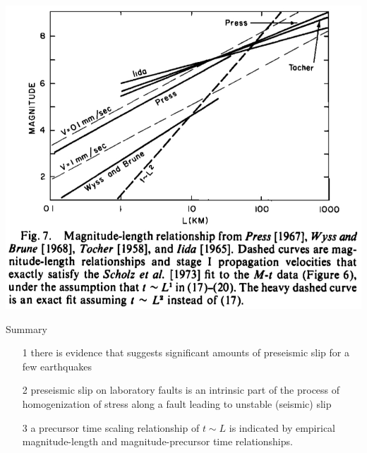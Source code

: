 \documentclass[aspectratio=43,9pt]{beamer}
\begin{document}
\begin{frame}{}

\begin{center}
  \includegraphics[width=0.6\linewidth]{Figs/figure_7.jpg}
\end{center}

\end{frame}




\begin{frame}{Summary}

\begin{itemize}
 \item[1] there is evidence
that suggests significant amounts of preseismic slip for a few earthquakes
 \item[2] preseismic slip on laboratory faults is an intrinsic part of the process of homogenization of stress along
a fault leading to unstable (seismic) slip
 \item[3] a precursor time scaling relationship of $t \sim L$ is indicated by empirical
magnitude-length and magnitude-precursor time relationships.
\end{itemize}

\end{frame}
\end{document}
